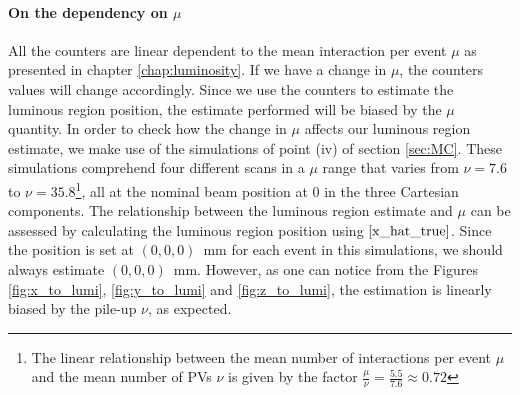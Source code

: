 \paragraph{On the dependency on $\mu$}\label{sec:mu_dependency}
All the counters are linear dependent to the mean interaction per event $\mu$ as presented in chapter \ref{chap:luminosity}. If we have a change in $\mu$, the counters values will change accordingly. Since we use the counters to estimate the luminous region position, the estimate performed will be biased by the $\mu$ quantity. In order to check how the change in $\mu$ affects our luminous region estimate, we make use of the simulations 
of point (iv) of section \ref{sec:MC}. These simulations comprehend four different scans in a $\mu$ range that varies from $\nu=7.6$ to $\nu=35.8$\footnote{The linear relationship between the mean number of interactions per event $\mu$ and the mean number of PVs $\nu$ is given by the factor $\tfrac{\mu}{\nu}=\frac{5.5}{7.6}\approx 0.72$}, all at the nominal beam position at $0$ in the three Cartesian components. 
The relationship between the luminous region estimate and $\mu$ can be assessed by calculating the luminous region position using $\ref{x_hat_true}$. Since the position is set at $(0,0,0)$~mm for each event in this simulations, we should always estimate $(0,0,0)$~mm. However, as one can notice from the Figures \ref{fig:x_to_lumi}, \ref{fig:y_to_lumi} and \ref{fig:z_to_lumi}, the estimation is linearly biased by the pile-up $\nu$, as expected. 
